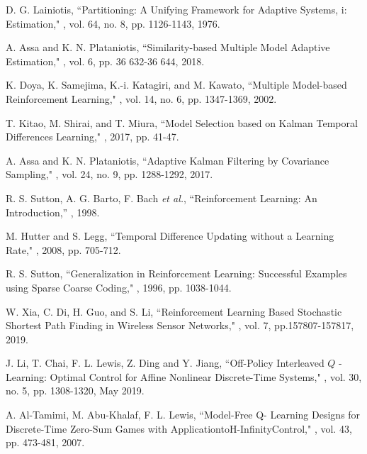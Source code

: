 \documentclass{ieeeaccess}
\begin{document}
\begin{thebibliography}{46}
 D. G. Lainiotis,
 \newblock ``Partitioning: A Unifying Framework for Adaptive Systems, i: Estimation,"
 , vol. 64, no. 8, pp. 1126-1143, 1976.

A. Assa and K. N. Plataniotis,
\newblock ``Similarity-based Multiple Model Adaptive Estimation,"
, vol. 6, pp. 36 632-36 644, 2018.

K. Doya, K. Samejima, K.-i. Katagiri, and M. Kawato,
``Multiple Model-based Reinforcement Learning,"
, vol. 14, no. 6, pp. 1347-1369, 2002.

 T. Kitao, M. Shirai, and T. Miura,
``Model Selection based on Kalman Temporal Differences Learning,"
, 2017, pp. 41-47.

A. Assa and K. N. Plataniotis,
\newblock ``Adaptive Kalman Filtering by Covariance Sampling,"
, vol. 24, no. 9, pp. 1288-1292, 2017.

 R. S. Sutton, A. G. Barto, F. Bach \textit{et al.},
\newblock ``Reinforcement Learning: An Introduction,''
, 1998.

M. Hutter and S. Legg,
\newblock ``Temporal Difference Updating without a Learning Rate,"
, 2008, pp. 705-712.

R. S. Sutton,
\newblock ``Generalization in Reinforcement Learning: Successful Examples using Sparse Coarse Coding,"
, 1996, pp. 1038-1044.

W. Xia, C. Di, H. Guo, and S. Li, \newblock ``Reinforcement Learning Based Stochastic Shortest Path Finding in Wireless Sensor Networks,"
, vol. 7, pp.157807-157817,  2019.

J. Li, T. Chai, F. L. Lewis, Z. Ding and Y. Jiang,
\newblock ``Off-Policy Interleaved $Q$ -Learning: Optimal Control for Affine Nonlinear Discrete-Time Systems,"
, vol. 30, no. 5, pp. 1308-1320, May 2019.

A. Al-Tamimi, M. Abu-Khalaf, F. L. Lewis,
\newblock ``Model-Free Q- Learning Designs for Discrete-Time Zero-Sum Games with ApplicationtoH-InfinityControl,"
, vol. 43, pp. 473-481, 2007.


\end{thebibliography}
\end{document}
